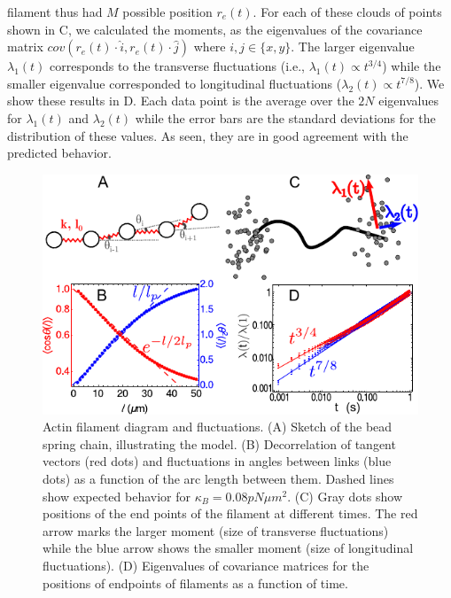\documentclass[12pt]{article}
\begin{document}
filament thus had $M$ possible position $r_e(t)$. For each of these clouds of points
shown in C, we calculated the moments, as the eigenvalues of 
the covariance matrix $cov(r_e(t)\cdot \hat{i},r_e(t)\cdot \hat{j})$ where
$i,j\in\{x,y\}$.
The larger eigenvalue $\lambda_1(t)$ corresponds to the transverse fluctuations
(i.e., $\lambda_1(t)\propto t^{3/4}$) while the smaller eigenvalue corresponded to 
longitudinal fluctuations ($\lambda_2(t)\propto t^{7/8}$). We show these results
in D. Each data point is the average over the $2N$ eigenvalues
for $\lambda_1(t)$ and $\lambda_2(t)$ while the error bars are the standard deviations for the
distribution of these values. As seen, they are in good agreement with the predicted behavior. 
\begin{figure}[H] 
  \centering
  \includegraphics[scale=1.2]{figs/pl_fig_2.pdf}
  \caption{\label{fig:filament}
  Actin filament diagram and fluctuations.
  (A) Sketch of the bead spring chain, illustrating the model.
  (B) Decorrelation of tangent vectors (red dots) and fluctuations in angles between links (blue dots) 
  as a function of the arc length between them. Dashed lines show expected behavior 
  for $\kappa_B=0.08 pN\mu m^2$.
  (C) Gray dots show positions of the end points of the filament at different times.
  The red arrow marks the larger moment (size of transverse fluctuations) while the blue arrow 
  shows the smaller moment (size of longitudinal fluctuations). 
  (D) Eigenvalues of covariance matrices for the positions of endpoints of filaments as a function of time\cite{everaers1999}. 
}
\end{figure} 
\end{document}
